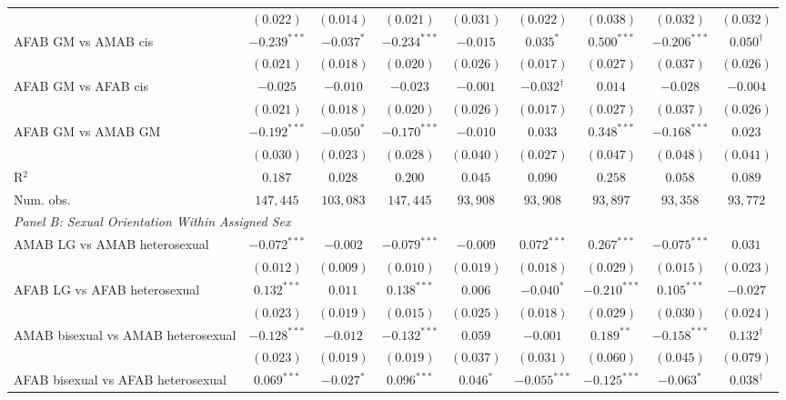 \begin{table}[htpb!]
{\begin{tabular}{l c c c c c c c c}
 & $(0.022)$ & $(0.014)$ & $(0.021)$ & $(0.031)$ & $(0.022)$ & $(0.038)$ & $(0.032)$ & $(0.032)$ \\
AFAB GM vs AMAB cis & $-0.239^{***}$ & $-0.037^{*}$ & $-0.234^{***}$ & $-0.015$ & $0.035^{*}$ & $0.500^{***}$ & $-0.206^{***}$ & $0.050^{\dagger}$ \\
 & $(0.021)$ & $(0.018)$ & $(0.020)$ & $(0.026)$ & $(0.017)$ & $(0.027)$ & $(0.037)$ & $(0.026)$ \\
AFAB GM vs AFAB cis & $-0.025$ & $-0.010$ & $-0.023$ & $-0.001$ & $-0.032^{\dagger}$ & $0.014$ & $-0.028$ & $-0.004$ \\
 & $(0.021)$ & $(0.018)$ & $(0.020)$ & $(0.026)$ & $(0.017)$ & $(0.027)$ & $(0.037)$ & $(0.026)$ \\
AFAB GM vs AMAB GM & $-0.192^{***}$ & $-0.050^{*}$ & $-0.170^{***}$ & $-0.010$ & $0.033$ & $0.348^{***}$ & $-0.168^{***}$ & $0.023$ \\
 & $(0.030)$ & $(0.023)$ & $(0.028)$ & $(0.040)$ & $(0.027)$ & $(0.047)$ & $(0.048)$ & $(0.041)$ \\
\hline
R$^2$ & $0.187$ & $0.028$ & $0.200$ & $0.045$ & $0.090$ & $0.258$ & $0.058$ & $0.089$ \\
Num. obs. & $147,445$ & $103,083$ & $147,445$ & $93,908$ & $93,908$ & $93,897$ & $93,358$ & $93,772$ \\
\hline
\multicolumn{9}{l}{\textit{Panel B: Sexual Orientation Within Assigned Sex}} \\
AMAB LG vs AMAB heterosexual & $-0.072^{***}$ & $-0.002$ & $-0.079^{***}$ & $-0.009$ & $0.072^{***}$ & $0.267^{***}$ & $-0.075^{***}$ & $0.031$ \\
 & $(0.012)$ & $(0.009)$ & $(0.010)$ & $(0.019)$ & $(0.018)$ & $(0.029)$ & $(0.015)$ & $(0.023)$ \\
AFAB LG vs AFAB heterosexual & $0.132^{***}$ & $0.011$ & $0.138^{***}$ & $0.006$ & $-0.040^{*}$ & $-0.210^{***}$ & $0.105^{***}$ & $-0.027$ \\
 & $(0.023)$ & $(0.019)$ & $(0.015)$ & $(0.025)$ & $(0.018)$ & $(0.029)$ & $(0.030)$ & $(0.024)$ \\
AMAB bisexual vs AMAB heterosexual & $-0.128^{***}$ & $-0.012$ & $-0.132^{***}$ & $0.059$ & $-0.001$ & $0.189^{**}$ & $-0.158^{***}$ & $0.132^{\dagger}$ \\
 & $(0.023)$ & $(0.019)$ & $(0.019)$ & $(0.037)$ & $(0.031)$ & $(0.060)$ & $(0.045)$ & $(0.079)$ \\
AFAB bisexual vs AFAB heterosexual & $0.069^{***}$ & $-0.027^{*}$ & $0.096^{***}$ & $0.046^{*}$ & $-0.055^{***}$ & $-0.125^{***}$ & $-0.063^{*}$ & $0.038^{\dagger}$ \\

\end{tabular}}
\end{table}
